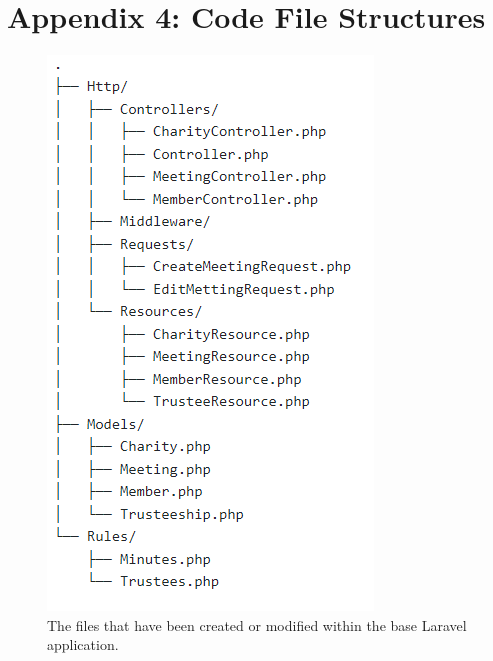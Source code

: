 \documentclass{UoYCSproject}
\begin{document}
\newpage
\section{Appendix 4: Code File Structures}
\label{sec:apendix_file_strictures}

\begin{figure}[H]
\begin{center}
\includegraphics[]{"./assets/apendix/Laravel App File Structure.PNG"}
\end{center}
\caption{The files that have been created or modified within the base Laravel application.}
\end{figure}
\end{document}
